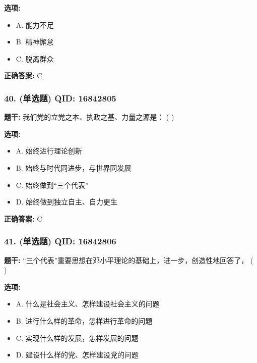 \documentclass[12pt,UTF8]{ctexart}
\begin{document}
\textbf{选项:}
\begin{itemize}[leftmargin=*]

  \item A. 能力不足

  \item B. 精神懈怠

  \item C. 脱离群众

\end{itemize}

\textbf{正确答案:}
C

\vspace{0.3em}\hrulefill\vspace{0.7em}

\subsubsection*{40. (单选题) \small QID: 16842805}

\textbf{题干:}
我们党的立党之本、执政之基、力量之源是： ( )

\textbf{选项:}
\begin{itemize}[leftmargin=*]

  \item A. 始终进行理论创新

  \item B. 始终与时代同进步，与世界同发展

  \item C. 始终做到“三个代表”

  \item D. 始终做到独立自主、自力更生

\end{itemize}

\textbf{正确答案:}
C

\vspace{0.3em}\hrulefill\vspace{0.7em}

\subsubsection*{41. (单选题) \small QID: 16842806}

\textbf{题干:}
“三个代表”重要思想在邓小平理论的基础上，进一步，创造性地回答了， ( )

\textbf{选项:}
\begin{itemize}[leftmargin=*]

  \item A. 什么是社会主义、怎样建设社会主义的问题

  \item B. 进行什么样的革命，怎样进行革命的问题

  \item C. 实现什么样的发展，怎样发展的问题

  \item D. 建设什么样的党、怎样建设党的问题

\end{itemize}
\end{document}
